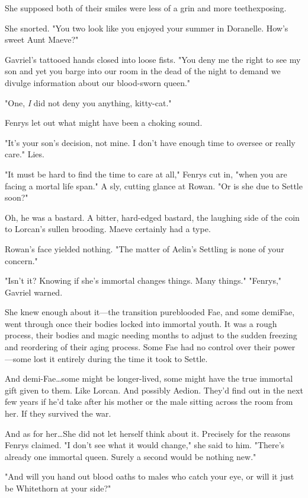 She supposed both of their smiles were less of a grin and more 
teethexposing.

She snorted.
"You two look like you enjoyed your summer in Doranelle.
How's sweet Aunt Maeve?"

Gavriel's tattooed hands closed into loose fists.
"You deny me the right to see my son and yet you barge into our room in the dead of the night to demand we divulge information about our blood-sworn queen."

"One, \emph{I} did not deny you anything, kitty-cat."

Fenrys let out what might have been a choking sound.

"It's your son's decision, not mine.
I don't have enough time to oversee or really care."
Lies.

"It must be hard to find the time to care at all," Fenrys cut in, "when you are facing a mortal life span."
A sly, cutting glance at Rowan.
"Or is she due to Settle soon?"

Oh, he was a bastard.
A bitter, hard-edged bastard, the laughing side of the coin to Lorcan's sullen brooding.
Maeve certainly had a type.

Rowan's face yielded nothing.
"The matter of Aelin's Settling is none of your concern."

"Isn't it?
Knowing if she's immortal changes things.
Many things."
"Fenrys," Gavriel warned.

She knew enough about it---the transition pureblooded Fae, and some demiFae, went through once their bodies locked into immortal youth.
It was a rough process, their bodies and magic needing months to adjust to the sudden freezing and reordering of their aging process.
Some Fae had no control over their power ---some lost it entirely during the time it took to Settle.

And demi-Fae\ldots some might be longer-lived, some might have the true immortal gift given to them.
Like Lorcan.
And possibly Aedion.
They'd find out in the next few years if he'd take after his mother  or the male sitting across the room from her.
If they survived the war.

And as for her\ldots She did not let herself think about it.
Precisely for the reasons Fenrys claimed.
"I don't see what it would change," she said to him.
"There's already one immortal queen.
Surely a second would be nothing new."

"And will you hand out blood oaths to males who catch your eye, or will it just be Whitethorn at your side?"

